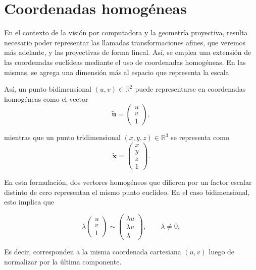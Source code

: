 \section{Coordenadas homogéneas}

En el contexto de la visión por computadora y la geometría proyectiva, resulta necesario poder representar las llamadas transformaciones afines, que veremos más adelante, y las proyectivas de forma lineal.  Así, se emplea una extensión de las coordenadas euclídeas mediante el uso de coordenadas homogéneas. En las mismas, se agrega una dimensión más al espacio que representa la escala.

Así, un punto bidimensional $(u, v) \in \mathbb{R}^2$ puede representarse en coordenadas homogéneas como el vector
\begin{equation}
    \tilde{\mathbf{u}} =
    \begin{pmatrix}
    u \\
    v \\
    1
    \end{pmatrix},
\end{equation}


\noindent mientras que un punto tridimensional $(x, y, z) \in \mathbb{R}^3$ se representa como
\begin{equation}
\tilde{\mathbf{x}} =
\begin{pmatrix}
x \\
y \\
z \\
1
\end{pmatrix}.
\end{equation}

En esta formulación, dos vectores homogéneos que difieren por un factor escalar distinto de cero representan el mismo punto euclídeo. En el caso bidimensional, esto implica que

\begin{equation}
\lambda
\begin{pmatrix}
u \\
v \\
1
\end{pmatrix}
\sim
\begin{pmatrix}
\lambda u \\
\lambda v \\
\lambda
\end{pmatrix},
\qquad \lambda \neq 0,
\end{equation}

Es decir, corresponden a la misma coordenada cartesiana $(u, v)$ luego de normalizar por la última componente.

